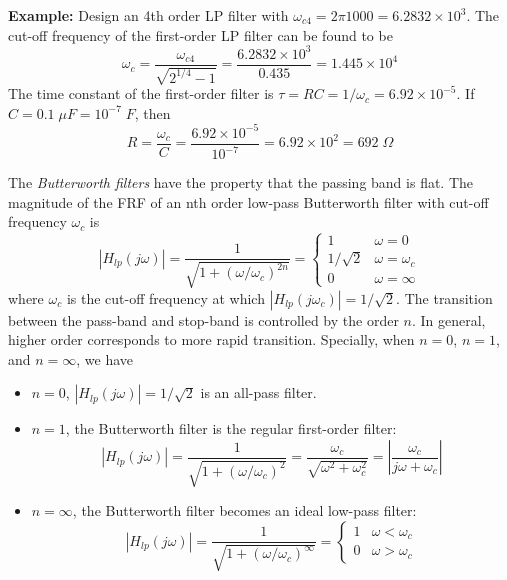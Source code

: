 \documentclass{article}
\begin{document}
  {\bf Example:} Design an 4th order LP filter with 
  $\omega_{c4}=2\pi 1000=6.2832\times 10^3$. The cut-off frequency of the 
  first-order LP filter can be found to be
  \begin{equation}
  \omega_c=\frac{\omega_{c4}}{\sqrt{2^{1/4}-1}}
  =\frac{6.2832\times 10^3}{0.435}=1.445\times 10^4
  \end{equation}
  The time constant of the first-order filter is 
  $\tau=RC=1/\omega_c=6.92\times 10^{-5}$. If $C=0.1\;\mu F=10^{-7}\;F$, 
  then
  \begin{equation}
  R=\frac{\omega_c}{C}=\frac{6.92\times 10^{-5}}{10^{-7}}
  =6.92\times 10^2=692\;\Omega
  \end{equation}

  The {\em Butterworth filters} have the property that the passing
  band is flat. The magnitude of the FRF of an nth order low-pass 
  Butterworth filter with cut-off frequency $\omega_c$ is
  \begin{equation}
  \left| H_{lp}(j\omega)\right|=\frac{1}{\sqrt{1+(\omega/\omega_c)^{2n}}}
  =\left\{\begin{array}{ll}1 & \omega=0\\1/\sqrt{2}&\omega=\omega_c\\
  0 & \omega=\infty\end{array}\right.
  \end{equation}
  where $\omega_c$ is the cut-off frequency at which $|H_{lp}(j\omega_c)|
  =1/\sqrt{2}$.
  The transition between the pass-band and stop-band is controlled by the
  order $n$. In general, higher order corresponds to more rapid transition. 
  Specially, when $n=0$, $n=1$, and $n=\infty$, we have
  \begin{itemize}
  \item $n=0$, $|H_{lp}(j\omega)|=1/\sqrt{2}$ is an all-pass filter.
  \item $n=1$, the Butterworth filter is the regular first-order filter:
    \begin{equation}
    |H_{lp}(j\omega)|=\frac{1}{\sqrt{1+(\omega/\omega_c)^2}}
    =\frac{\omega_c}{\sqrt{\omega^2+\omega_c^2}}
    =\left|\frac{\omega_c}{j\omega+\omega_c}\right|
    \end{equation}
  \item $n=\infty$, the Butterworth filter becomes an ideal low-pass
    filter:
    \begin{equation}
    |H_{lp}(j\omega)|=\frac{1}{\sqrt{1+(\omega/\omega_c)^\infty}}  
    =\left\{\begin{array}{ll}1&\omega<\omega_c\\0&\omega>\omega_c\end{array}
    \right.
    \end{equation}
  \end{itemize}
  
\end{document}
